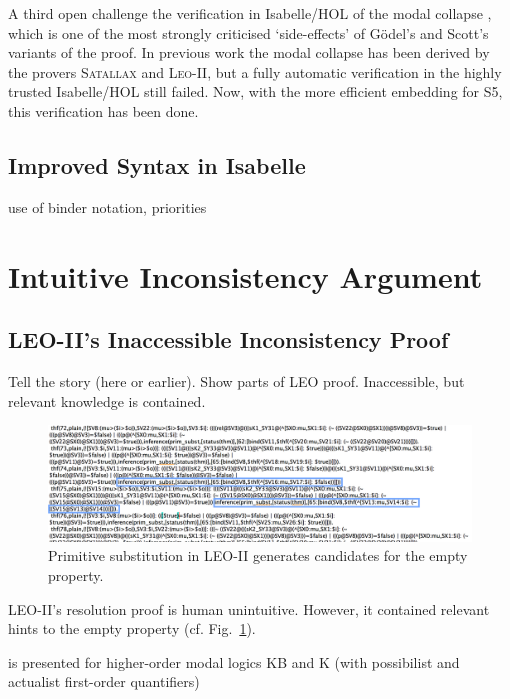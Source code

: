 \documentclass{article}
\begin{document}
A third open challenge the verification in Isabelle/HOL of the modal
  collapse \cite{Sobel}, which is one of the most strongly criticised
  `side-effects' of G\"odel's and Scott's variants of the proof. In previous work
  the modal collapse has been derived by the provers
  \textsc{Satallax} \cite{Satallax} and \textsc{Leo-II}, but a fully automatic
  verification in the highly trusted Isabelle/HOL still failed. 
  Now, with the more efficient embedding for S5, this verification has been done. 



\subsection{Improved Syntax in Isabelle}

use of binder notation, priorities 


\section{Intuitive Inconsistency Argument}
\subsection{LEO-II's Inaccessible Inconsistency Proof}
Tell the story (here or earlier). Show parts of LEO proof.  Inaccessible, but relevant knowledge
is contained.
\begin{figure}
\centerline{\includegraphics[width=\textwidth]{./Images/LEO-Proof.png}}
\caption{Primitive substitution in LEO-II generates candidates for the
empty property.} \label{LEO-Proof}
\end{figure}
LEO-II's resolution proof is human unintuitive. However, it contained
relevant hints to the empty property (cf. Fig.~\ref{LEO-Proof}).


is presented
  for higher-order modal logics KB and K (with possibilist and
  actualist first-order quantifiers)
\end{document}
